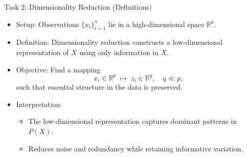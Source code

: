\documentclass[aspectratio=169]{beamer}
\newcommand{\1}{\mathbf{1}}
\begin{document}
\begin{frame}{Task 2: Dimensionality Reduction (Definitions)}
    \small
    \begin{itemize}
        \item Setup:
        Observations $\{x_i\}_{i=1}^n$ lie in a high-dimensional space $\mathbb{R}^p$.
        
        \item Definition:
        Dimensionality reduction constructs a low-dimensional representation of $X$
        using only information in $X$.
        
        \item Objective:
        Find a mapping
        \[
            x_i \in \mathbb{R}^p \;\longmapsto\; z_i \in \mathbb{R}^q, \quad q \ll p,
        \]
        such that essential structure in the data is preserved.
        
        \item Interpretation:
        \begin{itemize}
            \item The low-dimensional representation captures dominant patterns in $P(X)$.
            \item Reduces noise and redundancy while retaining informative variation.
        \end{itemize}
    \end{itemize}
\end{frame}
\end{document}
